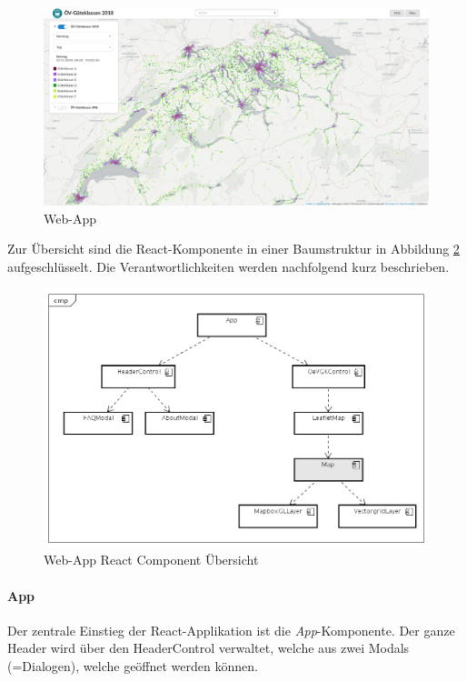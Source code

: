 \begin{figure}[ht]
    \centering
    \includegraphics[width=1.0\linewidth]{projectdoc/img/screenshot-webapp.png}
    \caption[Web-App]{Web-App}
    \label{fig:Web_App}
\end{figure}

Zur Übersicht sind die React-Komponente in einer Baumstruktur in Abbildung \ref{fig:Web_App_Component} aufgeschlüsselt.
Die Verantwortlichkeiten werden nachfolgend kurz beschrieben.

\begin{figure}[ht]
    \centering
    \includegraphics[width=1.0\linewidth]{projectdoc/img/Web-App_Component.png}
    \caption[Web-App React Component Übersicht]{Web-App React Component Übersicht}
    \label{fig:Web_App_Component}
\end{figure}
 
\paragraph{App}
Der zentrale Einstieg der React-Applikation ist die \emph{App}-Komponente.
Der ganze Header wird über den HeaderControl verwaltet, welche aus zwei Modals (=Dialogen), welche geöffnet werden können.

